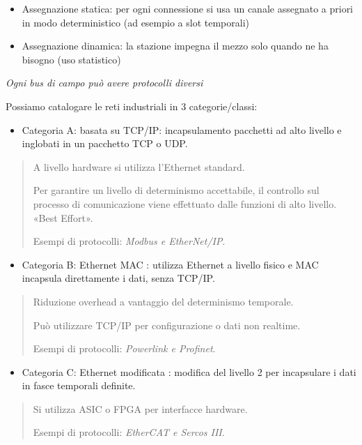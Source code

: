\begin{enumerate}
  \begin{itemize}
  \item
    Assegnazione statica: per ogni connessione si usa un canale
    assegnato a priori in modo deterministico (ad esempio a slot
    temporali)
  \item
    Assegnazione dinamica: la stazione impegna il mezzo solo quando ne
    ha bisogno (uso statistico)
  \end{itemize}
\end{enumerate}

\emph{Ogni bus di campo può avere protocolli diversi}

Possiamo catalogare le reti industriali in 3 categorie/classi:

\begin{itemize}
\item
  Categoria A: basata su TCP/IP: incapsulamento pacchetti ad alto
  livello e inglobati in un pacchetto TCP o UDP.
\end{itemize}

\begin{quote}
A livello hardware si utilizza l'Ethernet standard.

Per garantire un livello di determinismo accettabile, il controllo sul
processo di comunicazione viene effettuato dalle funzioni di alto
livello. «Best Effort».

Esempi di protocolli: \emph{Modbus e EtherNet/IP}.
\end{quote}

\begin{itemize}
\item
  Categoria B: Ethernet MAC : utilizza Ethernet a livello fisico e MAC
  incapsula direttamente i dati, senza TCP/IP.
\end{itemize}

\begin{quote}
Riduzione overhead a vantaggio del determinismo temporale.

Può utilizzare TCP/IP per configurazione o dati non realtime.

Esempi di protocolli: \emph{Powerlink e Profinet}.
\end{quote}

\begin{itemize}
\item
  Categoria C: Ethernet modificata : modifica del livello 2 per
  incapsulare i dati in fasce temporali definite.
\end{itemize}

\begin{quote}
Si utilizza ASIC o FPGA per interfacce hardware.

Esempi di protocolli: \emph{EtherCAT e Sercos III}.
\end{quote}

